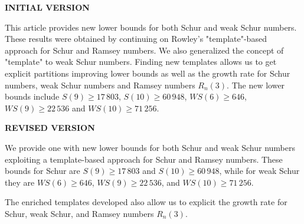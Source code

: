 \documentclass[12pt]{article}
\newcommand{\WS}{\mathit{WS}}
\begin{document}
\textbf{INITIAL VERSION}

\smallskip

This article provides new lower bounds for both Schur and weak Schur numbers. These results were obtained by 
continuing on Rowley's "template"-based approach for Schur and Ramsey numbers. We also generalized the concept 
of "template" to weak Schur numbers. Finding new templates allows us to get explicit partitions improving lower bounds 
as well as the growth rate for Schur numbers, weak Schur numbers and Ramsey numbers \(R_n(3)\). The new lower 
bounds include \(S(9) \geqslant 17\,803\), \(S(10) \geqslant 60\,948\), \(\WS(6) \geqslant 646\), \(\WS (9) \geqslant 22\,536\) and 
\(\WS (10) \geqslant 71\,256 \).


\bigskip

\textbf{REVISED VERSION}

\smallskip

We provide one with new lower bounds for both Schur and weak Schur numbers exploiting a template-based approach for Schur and Ramsey numbers. These bounds for Schur are \(S(9) \geqslant 17\,803\) and \(S(10) \geqslant 60\,948\), while for weak Schur they are \(\WS(6) \geqslant 646\), \(\WS (9) \geqslant 22\,536\), and 
\(\WS (10) \geqslant 71\,256 \).

The enriched templates developed also allow us to explicit the growth rate for Schur,  weak Schur, and Ramsey numbers \(R_n(3)\).
\end{document}
